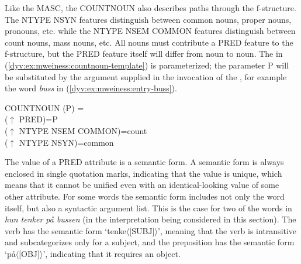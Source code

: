 \documentclass[output=paper]{langsci/langscibook}
\begin{document}
Like the  \textsf{MASC}, the  \textsf{COUNTNOUN} also describes paths through the f-structure.
The \textsf{NTYPE NSYN} features distinguish between common nouns, proper nouns, pronouns, etc. while the \textsf{NTYPE NSEM COMMON} features distinguish between count nouns, mass nouns, etc.
All nouns must contribute a \textsf{PRED} feature to the f-structure, but the \textsf{PRED} feature itself will differ from noun to noun.
The  in (\ref{dyv:ex:mweiness:countnoun-template}) is parameterized; the parameter \textsf{P} will be substituted by the argument supplied in the invocation of the , for example the word \textit{buss} in (\ref{dyv:ex:mweiness:entry-buss}).


\ea\label{dyv:ex:mweiness:countnoun-template}
{\sffamily 
COUNTNOUN (P) = \\
\hspace{2em}  ($\uparrow$ PRED)=P \\
\hspace{2em}  ($\uparrow$ NTYPE NSEM COMMON)=count \\
\hspace{2em}  ($\uparrow$ NTYPE NSYN)=common \\
}
\z

The value of a \textsf{PRED} attribute is a semantic form.
A semantic form is always enclosed in single quotation marks, indicating that the value is unique, which means that it cannot be unified even with an identical-looking value of some other attribute.
For some words the semantic form includes not only the word itself, but also a syntactic argument list.
This is the case for two of the words in \textit{hun tenker på bussen} (in the interpretation being considered in this section).
The verb has the semantic form \textsf{`tenke$\langle$[SUBJ]$\rangle$'}, meaning that the verb is intransitive and subcategorizes only for a subject, and the preposition has the semantic form \textsf{`på$\langle$[OBJ]$\rangle$'}, indicating that it requires an object.
\end{document}
